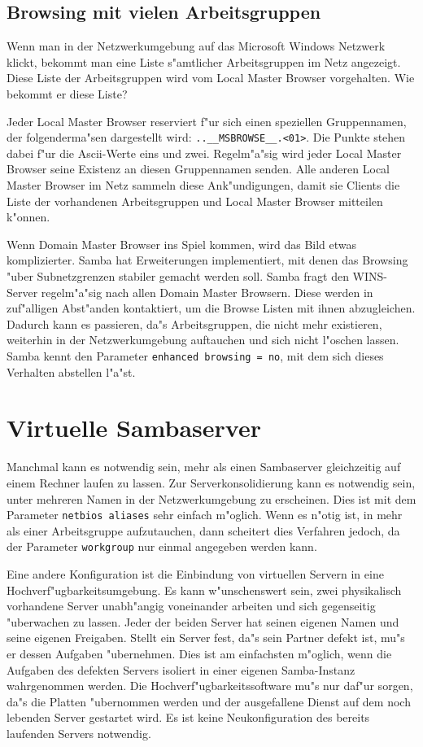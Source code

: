 \documentclass{scrartcl}\usepackage{pslatex}\typearea{12}
\newcommand{\param}{\texttt}
\newcommand{\nbname}{\texttt}
\begin{document}
\subsection{Browsing mit vielen Arbeitsgruppen}

Wenn man in der Netzwerkumgebung auf das Microsoft Windows Netzwerk
klickt, bekommt man eine Liste s"amtlicher Arbeitsgruppen im Netz
angezeigt. Diese Liste der Arbeitsgruppen wird vom Local Master
Browser vorgehalten. Wie bekommt er diese Liste?

Jeder Local Master Browser reserviert f"ur sich einen speziellen
Gruppennamen, der folgenderma"sen dargestellt wird:
\nbname{..\_\_MSBROWSE\_\_.<01>}. Die Punkte stehen dabei f"ur die
Ascii-Werte eins und zwei. Regelm"a"sig wird jeder Local Master
Browser seine Existenz an diesen Gruppennamen senden. Alle anderen
Local Master Browser im Netz sammeln diese Ank"undigungen, damit sie
Clients die Liste der vorhandenen Arbeitsgruppen und Local Master
Browser mitteilen k"onnen.

Wenn Domain Master Browser ins Spiel kommen, wird das Bild etwas
komplizierter. Samba hat Erweiterungen implementiert, mit denen das
Browsing "uber Subnetzgrenzen stabiler gemacht werden soll. Samba
fragt den WINS-Server regelm"a"sig nach allen Domain Master Browsern.
Diese werden in zuf"alligen Abst"anden kontaktiert, um die Browse
Listen mit ihnen abzugleichen. Dadurch kann es passieren, da"s
Arbeitsgruppen, die nicht mehr existieren, weiterhin in der
Netzwerkumgebung auftauchen und sich nicht l"oschen lassen. Samba
kennt den Parameter \param{enhanced browsing = no}, mit dem sich
dieses Verhalten abstellen l"a"st.

\section{Virtuelle Sambaserver}
\label{virtuelle-server}

Manchmal kann es notwendig sein, mehr als einen Sambaserver
gleichzeitig auf einem Rechner laufen zu lassen. Zur
Serverkonsolidierung kann es notwendig sein, unter mehreren Namen in
der Netzwerkumgebung zu erscheinen. Dies ist mit dem Parameter
\param{netbios aliases} sehr einfach m"oglich. Wenn es n"otig ist, in
mehr als einer Arbeitsgruppe aufzutauchen, dann scheitert dies
Verfahren jedoch, da der Parameter \param{workgroup} nur einmal
angegeben werden kann.

Eine andere Konfiguration ist die Einbindung von virtuellen Servern in
eine Hochverf"ugbarkeitsumgebung. Es kann w"unschenswert sein, zwei
physikalisch vorhandene Server unabh"angig voneinander arbeiten und
sich gegenseitig "uberwachen zu lassen. Jeder der beiden Server hat
seinen eigenen Namen und seine eigenen Freigaben. Stellt ein Server
fest, da"s sein Partner defekt ist, mu"s er dessen Aufgaben
"ubernehmen. Dies ist am einfachsten m"oglich, wenn die Aufgaben des
defekten Servers isoliert in einer eigenen Samba-Instanz wahrgenommen
werden. Die Hochverf"ugbarkeitssoftware mu"s nur daf"ur sorgen, da"s
die Platten "ubernommen werden und der ausgefallene Dienst auf dem
noch lebenden Server gestartet wird. Es ist keine Neukonfiguration des
bereits laufenden Servers notwendig.
\end{document}
